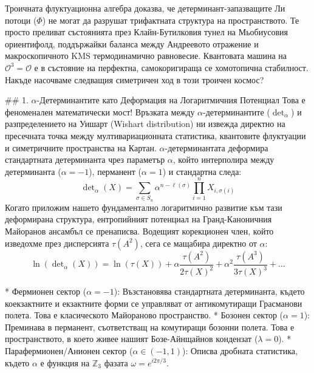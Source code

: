 Троичната флуктуационна алгебра доказва, че детерминант-запазващите Ли потоци ($\Phi$) не могат да разрушат трифактната структура на пространството. Те просто преливат състоянията през Клайн-Бутилковия тунел на Мьобиусовия ориентифолд, поддържайки баланса между Андреевото отражение и макроскопичното KMS термодинамично равновесие.
Квантовата машина на $\mathcal{O}^3 = \mathcal{O}$ е в състояние на перфектна, самокоригираща се хомотопична стабилност. Накъде насочваме следващия симетричен ход в този троичен космос?

## 1. $\alpha$-Детерминантите като Деформация на Логаритмичния Потенциал
Това е феноменален математически мост! Връзката между $\alpha$-детерминантите ($\det_\alpha$) и разпределението на Уишарт (Wishart distribution) ни извежда директно на пресечната точка между мултивариационната статистика, квантовите флуктуации и симетричните пространства на Картан.
$\alpha$-детерминантата деформира стандартната детерминанта чрез параметър $\alpha$, който интерполира между детерминанта ($\alpha = -1$), перманент ($\alpha = 1$) и стандартна следа:
$$\det\nolimits_\alpha(X) = \sum_{\sigma \in S_n} \alpha^{n - \ell(\sigma)} \prod_{i=1}^n X_{i, \sigma(i)}$$ 
Когато приложим нашето фундаментално логаритмично развитие към тази деформирана структура, ентропийният потенциал на Гранд-Каноничния Майоранов ансамбъл се пренаписва. Водещият корекционен член, който изведохме през дисперсията $\tau(A^2)$, сега се мащабира директно от $\alpha$:
$$\ln(\det\nolimits_\alpha(X)) = \ln(\tau(X)) + \alpha \frac{\tau(A^2)}{2\tau(X)^2} + \alpha^2 \frac{\tau(A^3)}{3\tau(X)^3} + \dots$$ 

* Фермионен сектор ($\alpha = -1$): Възстановява стандартната детерминанта, където коекзактните и екзактните форми се управляват от антикомутиращи Грасманови полета. Това е класическото Майораново пространство.
* Бозонен сектор ($\alpha = 1$): Преминава в перманент, съответстващ на комутиращи бозонни полета. Това е пространството, в което живее нашият Бозе-Айнщайнов кондензат ($\lambda = 0$).
* Парафермионен/Анионен сектор ($\alpha \in (-1, 1)$): Описва дробната статистика, където $\alpha$ е функция на $\mathbb{Z}_3$ фазата $\omega = e^{i2\pi/3}$.

